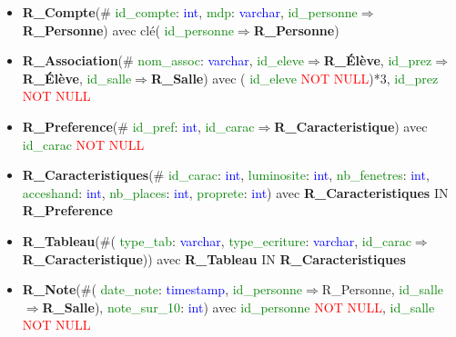 \documentclass{article}
\begin{document}
\begin{itemize}
\item \textbf{R\_Compte}(\#\textcolor{green}{ id\_compte}: \textcolor{blue}{ int}, \textcolor{green}{ mdp}: \textcolor{blue}{ varchar}, \textcolor{green}{ id\_personne}$\Rightarrow$\textbf{R\_Personne}) avec clé(\textcolor{green}{ id\_personne}$\Rightarrow$\textbf{R\_Personne})\\

\item \textbf{R\_Association}(\#\textcolor{green}{ nom\_assoc}: \textcolor{blue}{ varchar}, \textcolor{green}{ id\_eleve}$\Rightarrow$\textbf{R\_Élève},\textcolor{green}{  id\_prez}$\Rightarrow$\textbf{R\_Élève},\textcolor{green}{  id\_salle}$\Rightarrow$\textbf{R\_Salle}) avec (\textcolor{green}{ id\_eleve} \textcolor{red}{NOT NULL})*3, \textcolor{green}{ id\_prez} \textcolor{red}{NOT NULL}\\

\item \textbf{R\_Preference}(\#\textcolor{green}{ id\_pref}: \textcolor{blue}{ int},\textcolor{green}{ id\_carac}$\Rightarrow$\textbf{R\_Caracteristique}) avec \textcolor{green}{ id\_carac} \textcolor{red}{NOT NULL}\\

\item \textbf{R\_Caracteristiques}(\#\textcolor{green}{ id\_carac}: \textcolor{blue}{ int}, \textcolor{green}{ luminosite}: \textcolor{blue}{ int}, \textcolor{green}{ nb\_fenetres}: \textcolor{blue}{ int}, \textcolor{green}{ acceshand}: \textcolor{blue}{ int}, \textcolor{green}{ nb\_places}: \textcolor{blue}{ int}, \textcolor{green}{ proprete}: \textcolor{blue}{ int}) avec \textbf{R\_Caracteristiques} IN \textbf{R\_Preference} \\

\item \textbf{R\_Tableau}(\#(\textcolor{green}{ type\_tab}: \textcolor{blue}{ varchar}, \textcolor{green}{ type\_ecriture}: \textcolor{blue}{ varchar}, \textcolor{green}{ id\_carac}$\Rightarrow$\textbf{R\_Caracteristique})) avec \textbf{R\_Tableau} IN \textbf{R\_Caracteristiques} \\

\item \textbf{R\_Note}(\#(\textcolor{green}{ date\_note}: \textcolor{blue}{ timestamp},\textcolor{green}{ id\_personne}$\Rightarrow$R\_Personne,\textcolor{green}{ id\_salle}$\Rightarrow$\textbf{R\_Salle}),\textcolor{green}{ note\_sur\_10}: \textcolor{blue}{ int}) avec \textcolor{green}{ id\_personne} \textcolor{red}{NOT NULL}, \textcolor{green}{ id\_salle} \textcolor{red}{NOT NULL} \\


\end{itemize}
\end{document}
